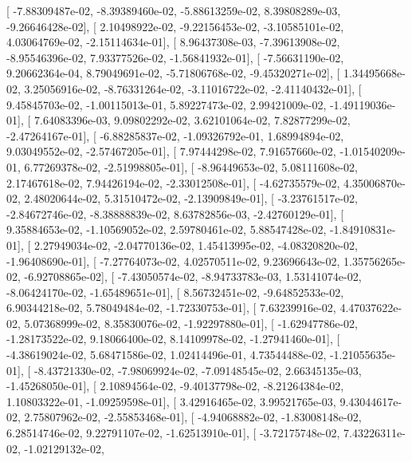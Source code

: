 \documentclass{article}
\begin{document}
       [ -7.88309487e-02,  -8.39389460e-02,  -5.88613259e-02,
          8.39808289e-03,  -9.26646428e-02],
       [  2.10498922e-02,  -9.22156453e-02,  -3.10585101e-02,
          4.03064769e-02,  -2.15114634e-01],
       [  8.96437308e-03,  -7.39613908e-02,  -8.95546396e-02,
          7.93377526e-02,  -1.56841932e-01],
       [ -7.56631190e-02,   9.20662364e-04,   8.79049691e-02,
         -5.71806768e-02,  -9.45320271e-02],
       [  1.34495668e-02,   3.25056916e-02,  -8.76331264e-02,
         -3.11016722e-02,  -2.41140432e-01],
       [  9.45845703e-02,  -1.00115013e-01,   5.89227473e-02,
          2.99421009e-02,  -1.49119036e-01],
       [  7.64083396e-03,   9.09802292e-02,   3.62101064e-02,
          7.82877299e-02,  -2.47264167e-01],
       [ -6.88285837e-02,  -1.09326792e-01,   1.68994894e-02,
          9.03049552e-02,  -2.57467205e-01],
       [  7.97444298e-02,   7.91657660e-02,  -1.01540209e-01,
          6.77269378e-02,  -2.51998805e-01],
       [ -8.96449653e-02,   5.08111608e-02,   2.17467618e-02,
          7.94426194e-02,  -2.33012508e-01],
       [ -4.62735579e-02,   4.35006870e-02,   2.48020644e-02,
          5.31510472e-02,  -2.13909849e-01],
       [ -3.23761517e-02,  -2.84672746e-02,  -8.38888839e-02,
          8.63782856e-03,  -2.42760129e-01],
       [  9.35884653e-02,  -1.10569052e-02,   2.59780461e-02,
          5.88547428e-02,  -1.84910831e-01],
       [  2.27949034e-02,  -2.04770136e-02,   1.45413995e-02,
         -4.08320820e-02,  -1.96408690e-01],
       [ -7.27764073e-02,   4.02570511e-02,   9.23696643e-02,
          1.35756265e-02,  -6.92708865e-02],
       [ -7.43050574e-02,  -8.94733783e-03,   1.53141074e-02,
         -8.06424170e-02,  -1.65489651e-01],
       [  8.56732451e-02,  -9.64852533e-02,   6.90344218e-02,
          5.78049484e-02,  -1.72330753e-01],
       [  7.63239916e-02,   4.47037622e-02,   5.07368999e-02,
          8.35830076e-02,  -1.92297880e-01],
       [ -1.62947786e-02,  -1.28173522e-02,   9.18066400e-02,
          8.14109978e-02,  -1.27941460e-01],
       [ -4.38619024e-02,   5.68471586e-02,   1.02414496e-01,
          4.73544488e-02,  -1.21055635e-01],
       [ -8.43721330e-02,  -7.98069924e-02,  -7.09148545e-02,
          2.66345135e-03,  -1.45268050e-01],
       [  2.10894564e-02,  -9.40137798e-02,  -8.21264384e-02,
          1.10803322e-01,  -1.09259598e-01],
       [  3.42916465e-02,   3.99521765e-03,   9.43044617e-02,
          2.75807962e-02,  -2.55853468e-01],
       [ -4.94068882e-02,  -1.83008148e-02,   6.28514746e-02,
          9.22791107e-02,  -1.62513910e-01],
       [ -3.72175748e-02,   7.43226311e-02,  -1.02129132e-02,
\end{document}
